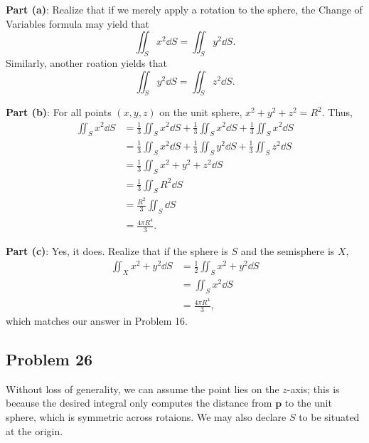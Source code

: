 \documentclass[11pt]{article}
\renewcommand{\vec}[1]{\mathbf{#1}}
\begin{document}
\textbf{Part (a)}: Realize that if we merely apply a rotation to the sphere, the Change of Variables formula may yield that
\[
	\iint_{S} x^{2} \dd{S} = \iint_{S} y^{2} \dd{S}.
\]
Similarly, another roation yields that
\[
	\iint_{S} y^{2} \dd{S}  = \iint_{S} z^{2} \dd{S}.
\]

\textbf{Part (b)}: For all points $(x, y, z)$ on the unit sphere, $x^{2} + y^{2} + z^{2} = R^{2}$. Thus,
\begin{align*}
	\iint_{S} x^{2} \dd{S} &= \frac{1}{3} \iint_{S} x^{2} \dd{S} + \frac{1}{3} \iint_{S} x^{2} \dd{S} + \frac{1}{3} \iint_{S} x^{2} \dd{S} \\
	&= \frac{1}{3} \iint_{S} x^{2} \dd{S} + \frac{1}{3} \iint_{S} y^{2} \dd{S} + \frac{1}{3} \iint_{S} z^{2} \dd{S} \\
	&= \frac{1}{3} \iint_{S} x^{2} + y^{2} + z^{2} \dd{S} \\
	&= \frac{1}{3} \iint_{S} R^{2} \dd{S} \\
	&= \frac{R^{2}}{3} \iint_{S} \dd{S} \\
	&= \boxed{\frac{4\pi R^{4}}{3}}.
\end{align*}

\textbf{Part (c)}: Yes, it does. Realize that if the sphere is $S$ and the semisphere is $X$,
\begin{align*}
	\iint_{X} x^{2} + y^{2} \dd{S} &= \frac{1}{2} \iint_{S} x^{2} + y^{2} \dd{S} \\
								   &= \iint_{S} x^{2} \dd{S} \\
								   &= \boxed{\frac{4\pi R^{4}}{3}},
\end{align*}
which matches our answer in Problem 16.


\subsection*{Problem 26}

Without loss of generality, we can assume the point lies on the $z$-axis; this is because the desired integral only computes the distance from $\vec{p}$ to the unit sphere, which is symmetric across rotaions. We may also declare $S$ to be situated at the origin.
\end{document}
